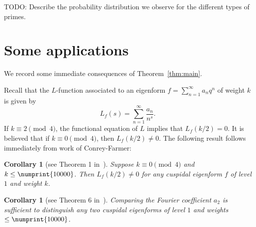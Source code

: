 \documentclass[11pt]{article}
\theoremstyle{plain}
\newtheorem{corollary}[theorem]{Corollary}
\theoremstyle{definition}
\theoremstyle{remark}
\numberwithin{equation}{section}
\numberwithin{table}{section}
\newcommand{\bound}{\numprint{10000}}
\begin{document}
TODO: Describe the probability distribution we observe for the different types
of primes.



\section{Some applications}

We record some immediate consequences of Theorem~\ref{thm:main}.

Recall that the $L$-function associated to an eigenform $f=\sum_{n=1}^\infty
a_n q^n$ of weight $k$ is given by
\begin{equation*}
  L_f(s)=\sum_{n=1}^\infty \frac{a_n}{n^s}.
\end{equation*}
If $k\equiv 2\pmod{4}$, the functional equation of $L$ implies that
$L_f(k/2)=0$.  It is believed that if $k\equiv 0\pmod{4}$, then $L_f(k/2)\neq
0$.  The following result follows immediately from work of Conrey-Farmer: 

\begin{corollary}[see Theorem 1 in~\cite{ConreyFarmer}]
  Suppose $k\equiv 0\pmod{4}$ and $k\leq\bound$.  Then
  $L_f(k/2)\neq 0$ for any cuspidal eigenform $f$ of level $1$ and weight $k$.
\end{corollary}

\begin{corollary}[see Theorem 6 in~\cite{Ghitza}]
  Comparing the Fourier coefficient $a_2$ is sufficient to distinguish any two
  cuspidal eigenforms of level $1$ and weights $\leq\numprint{10000}$.
\end{corollary}


\printbibliography
\end{document}
